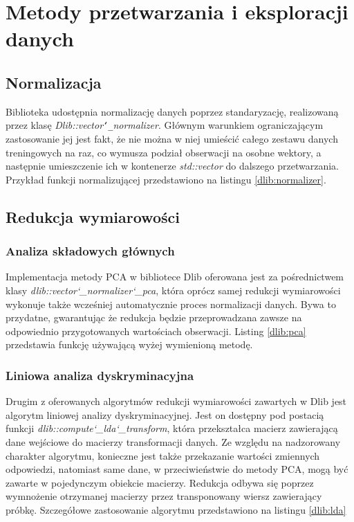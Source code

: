 \section{Metody przetwarzania i eksploracji danych}

\subsection{Normalizacja}
Biblioteka udostępnia normalizację danych poprzez standaryzację, realizowaną przez klasę \textit{Dlib::vector\texttt{\char`_}normalizer}. Głównym warunkiem ograniczającym zastosowanie jej jest fakt, że nie można w niej umieścić całego zestawu danych treningowych na raz, co wymusza podział obserwacji na osobne wektory, a następnie umieszczenie ich w kontenerze \textit{std::vector} do dalszego przetwarzania. Przykład funkcji normalizującej przedstawiono na listingu \ref{dlib:normalizer}.


\subsection{Redukcja wymiarowości}

\subsubsection{Analiza składowych głównych}

Implementacja metody PCA w bibliotece Dlib oferowana jest za pośrednictwem klasy \textit{dlib::vector\char`_normalizer\char`_pca}, która oprócz samej redukcji wymiarowości wykonuje także wcześniej automatycznie proces normalizacji danych. Bywa to przydatne, gwarantując że redukcja będzie przeprowadzana zawsze na odpowiednio przygotowanych wartościach obserwacji. Listing \ref{dlib:pca} przedstawia funkcję używającą wyżej wymienioną metodę.


\subsubsection{Liniowa analiza dyskryminacyjna}

Drugim z oferowanych algorytmów redukcji wymiarowości zawartych w Dlib jest algorytm liniowej analizy dyskryminacyjnej. Jest on dostępny pod postacią funkcji \textit{dlib::compute\char`_lda\char`_transform}, która przekształca macierz zawierającą dane wejściowe do macierzy transformacji danych. Ze względu na nadzorowany charakter algorytmu, konieczne jest także przekazanie wartości zmiennych odpowiedzi, natomiast same dane, w przeciwieństwie do metody PCA, mogą być zawarte w pojedynczym obiekcie macierzy. Redukcja odbywa się poprzez wymnożenie otrzymanej macierzy przez transponowany wiersz zawierający próbkę. Szczegółowe zastosowanie algorytmu przedstawiono na listingu \ref{dlib:lda}

